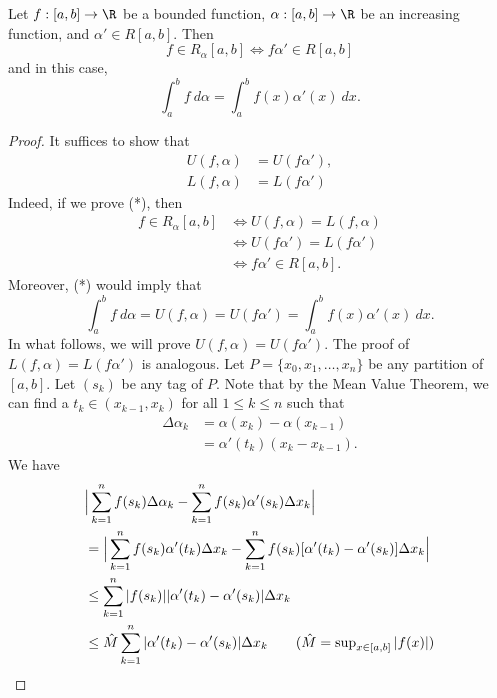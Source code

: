 \begin{theorem}[Rudin 6.17]\label{Rudin 6.17}
    Let \( f:[a,b] \to \R  \) be a bounded function, \( \alpha: [a,b] \to \R  \) be an increasing function, and \( \alpha' \in R[a,b] \). Then
    \[  f \in {R}_{\alpha}[a,b] \iff f \alpha' \in R[a,b] \]
    and in this case, 
    \[  \int_{ a }^{ b } f  \ d \alpha = \int_{ a }^{ b }  f(x) \alpha'(x) \ dx. \]
\end{theorem}
\begin{proof}
It suffices to show that 
\begin{align*}
    U(f,\alpha) &= U(f \alpha'), \\
    L(f,\alpha) &= L(f \alpha')
\end{align*}
Indeed, if we prove (*), then
\begin{align*}
    f \in {R}_{\alpha}[a,b] &\iff U(f,\alpha) = L(f,\alpha)  \\
                            &\iff U(f \alpha') = L(f \alpha') \\
                            &\iff f \alpha' \in R[a,b].
\end{align*}
Moreover, (*) would imply that
\[  \int_{ a }^{ b }  f  \ d \alpha = U(f,\alpha) = U(f \alpha') = \int_{ a }^{ b }  f(x) \alpha'(x)  \ dx.  \]
In what follows, we will prove \( U(f,\alpha) = U(f \alpha') \). The proof of \( L(f,\alpha) = L(f \alpha') \) is analogous. Let \( P = \{ {x}_{0}, {x}_{1}, \dots , {x}_{n} \}  \) be any partition of \( [a,b] \). Let \( ({s}_{k})  \) be any tag of \( P  \). 
Note that by the Mean Value Theorem, we can find a \( {t}_{k} \in ({x}_{k-1}, {x}_{k}) \) for all \( 1 \leq k \leq n  \) such that
\begin{align*}
    \Delta {\alpha}_{k } &= \alpha({x}_{k}) - \alpha({x}_{k-1}) \\
                         &= \alpha'({t}_{k}) ({x}_{k} - {x}_{k-1}).
\end{align*}
We have
\begin{align*}
    &\Big| \sum_{ k=1  }^{ n } f({s}_{k}) \Delta {\alpha}_{k } - \sum_{ k=1  }^{ n } f({s}_{k}) \alpha'({s}_{k}) \Delta {x}_{k} \Big|   \\
    &= \Big| \sum_{ k=1  }^{ n } f({s}_{k}) \alpha'({t}_{k}) \Delta {x}_{k} - \sum_{ k=1  }^{ n } f({s}_{k}) [\alpha'({t}_{k}) - \alpha'({s}_{k})] \Delta {x}_{k} \Big| \\
    &\leq \sum_{ k=1  }^{ n } | f({s}_{k}) | | \alpha'({t}_{k}) - \alpha'({s}_{k}) |  \Delta {x}_{k} \\
    &\leq \hat{M} \sum_{ k=1  }^{ n } | \alpha'({t}_{k}) - \alpha'({s}_{k}) | \Delta {x}_{k} \tag{\( \hat{M} = \sup_{x \in [a,b]} | f(x) |  \)} \\

\end{align*}
\end{proof}
